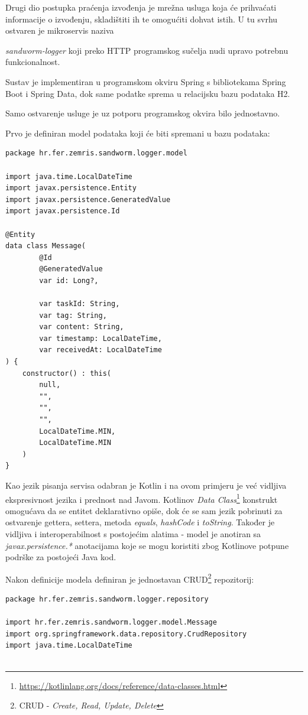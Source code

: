 \documentclass[times, utf8, zavrsni]{fer}
\begin{document}
Drugi dio postupka praćenja izvođenja je mrežna usluga koja će prihvaćati informacije o izvođenju, skladištiti ih te omogućiti dohvat istih. U tu svrhu ostvaren je mikroservis naziva {\textit{sandworm-logger} koji preko HTTP programskog sučelja nudi upravo potrebnu funkcionalnost.

Sustav je implementiran u programskom okviru Spring s bibliotekama Spring Boot i Spring Data, dok same podatke sprema u relacijsku bazu podataka H2.

Samo ostvarenje usluge je uz potporu programskog okvira bilo jednostavno.

Prvo je definiran model podataka koji će biti spremani u bazu podataka:

\begin{lstlisting}
package hr.fer.zemris.sandworm.logger.model

import java.time.LocalDateTime
import javax.persistence.Entity
import javax.persistence.GeneratedValue
import javax.persistence.Id

@Entity
data class Message(
        @Id
        @GeneratedValue
        var id: Long?,

        var taskId: String,
        var tag: String,
        var content: String,
        var timestamp: LocalDateTime,
        var receivedAt: LocalDateTime
) {
    constructor() : this(
	 	null,
		"",
		"",
		"",
		LocalDateTime.MIN,
		LocalDateTime.MIN
	)
}
\end{lstlisting}

Kao jezik pisanja servisa odabran je Kotlin i na ovom primjeru je već vidljiva ekspresivnost jezika i prednost nad Javom. Kotlinov {\textit{Data Class}}{\footnote{\url{https://kotlinlang.org/docs/reference/data-classes.html}}} konstrukt omogućava da se entitet deklarativno opiše, dok će se sam jezik pobrinuti za ostvarenje gettera, settera, metoda {\textit{equals}}, {\textit{hashCode}} i {\textit{toString}}. Također je vidljiva i interoperabilnost s postojećim alatima - model je anotiran sa {\textit{javax.persistence.*}} anotacijama koje se mogu koristiti zbog Kotlinove potpune podrške za postojeći Java kod.


Nakon definicije modela definiran je jednostavan CRUD{\footnote{CRUD - {\textit{Create, Read, Update, Delete}}}} repozitorij:

\begin{lstlisting}
package hr.fer.zemris.sandworm.logger.repository

import hr.fer.zemris.sandworm.logger.model.Message
import org.springframework.data.repository.CrudRepository
import java.time.LocalDateTime


\end{lstlisting}}
\end{document}
